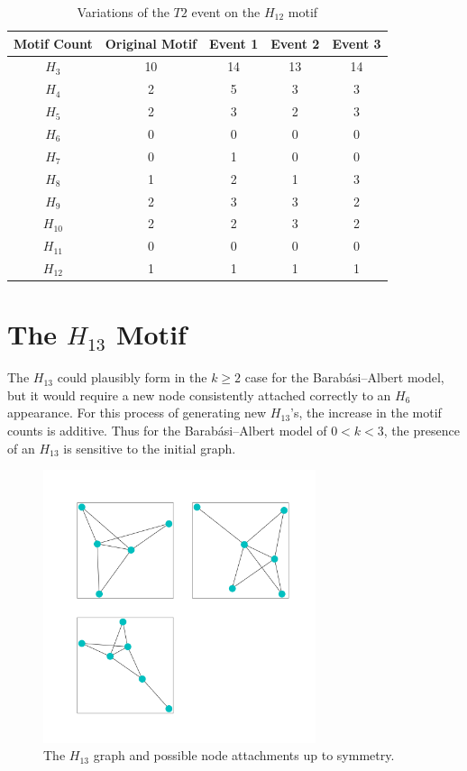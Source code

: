 \begin{table}
    \centering
    \begin{tabular}{||c c c c c||} 
    \hline
    Motif Count & Original Motif & Event 1 & Event 2 & Event 3 \\ [0.5ex] 
    \hline\hline
    $H_{3}$ & 10 & 14 & 13 & 14\\ 
    \hline
    $H_{4}$ & 2 & 5 & 3 & 3 \\
    \hline
    $H_{5}$ & 2 & 3 & 2 & 3 \\
    \hline
    $H_{6}$ & 0 & 0 & 0 & 0 \\
    \hline
    $H_{7}$ & 0 & 1 & 0 & 0 \\
    \hline
    $H_{8}$ & 1 & 2 & 1 & 3\\
    \hline
    $H_{9}$ & 2 & 3 & 3 & 2 \\
    \hline
    $H_{10}$ & 2 & 2 & 3 & 2 \\
    \hline
    $H_{11}$ & 0 & 0 & 0 & 0 \\
    \hline
    $H_{12}$ & 1 & 1 & 1 & 1\\
    \hline
   \end{tabular}
   \caption{Variations of the $T2$ event on the $H_{12}$ motif}
   \label{table:10}
\end{table}


\FloatBarrier

\section{The \texorpdfstring{$H_{13}$}{H3} Motif}
The $H_{13}$ could plausibly form in the $k \geq 2$ case for the 
Barabási–Albert model, but it would require a new node consistently attached correctly to an $H_{6}$ appearance.
 For this process of generating new $H_{13}$'s, the increase in the motif counts is additive.
 Thus for the Barabási–Albert model of $0<k<3$, the presence of an $H_{13}$ is sensitive
to the initial graph.

\begin{figure}[!ht]
    \includegraphics[width=8cm]{Images/H13_evolution.png}
    \centering
    \caption{The $H_{13}$ graph and possible node attachments up to symmetry.}
\end{figure}

